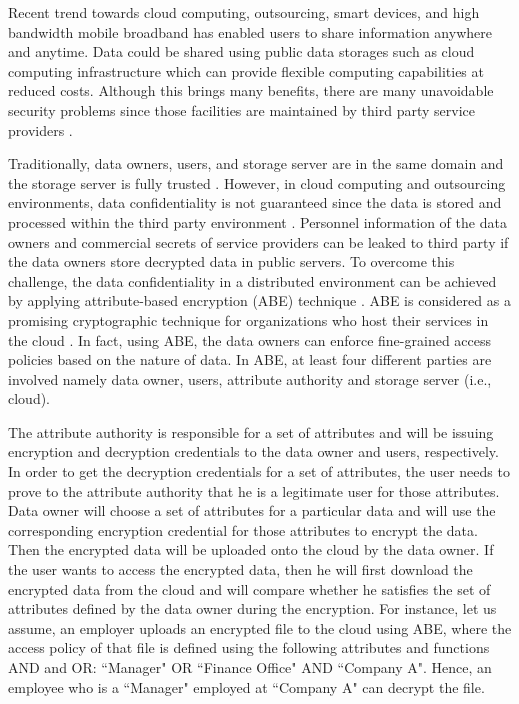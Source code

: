 \documentclass[10pt,journal]{IEEEtran}
\begin{document}
Recent trend towards cloud computing, outsourcing, smart devices, and high bandwidth mobile broadband has enabled users to share information anywhere and anytime. Data could be shared using public data storages such as cloud computing infrastructure which can provide flexible computing capabilities at reduced costs. Although this brings many benefits, there are many unavoidable security problems since those facilities are maintained by third party service providers \cite{SRuj}.

Traditionally,  data owners, users, and  storage server are in the same  domain and  the storage server is fully trusted \cite{RBAC, CWDRBAC, ERBAC, TRBAC, SRBAC, ESRBAC, LRBAC, LAAC, ESTAC}. However, in cloud computing and outsourcing  environments, data confidentiality is not guaranteed since the data is stored and processed within the third party environment \cite{Rahul5,Rahul6,Rahul7,Rahul8}. Personnel information of the data owners and  commercial secrets of service providers can be leaked to third party if the data owners  store decrypted data in public servers. To overcome this challenge, the data confidentiality in a distributed environment can be achieved by applying attribute-based encryption (ABE) technique \cite{FIBE, kpabe,cpabe}. ABE  is considered as a promising cryptographic technique for organizations who host their services in the cloud \cite{FIBE, kpabe,cpabe,Rahul1}. In fact, using ABE, the data owners can enforce fine-grained access policies based on the nature of data. In ABE, at least four different parties are involved namely data owner, users, attribute authority and storage server (i.e., cloud). 

The attribute authority is responsible for a set of attributes and will be issuing encryption and decryption credentials to the data owner and users, respectively. In order to get the decryption credentials for a set of attributes, the user needs to prove to the attribute authority that he is a legitimate user for those attributes. Data owner will choose a set of attributes for a particular data and will use the corresponding encryption credential for those attributes to encrypt the data. Then the encrypted data will be uploaded onto the cloud by the data owner. If the user wants to access the encrypted data, then he will first download the encrypted data from the cloud and will compare whether he satisfies the set of attributes defined by the data owner during the encryption. For instance, let us assume, an employer uploads an  encrypted file to the cloud using ABE, where the access policy of that file is defined using the following attributes and functions AND and OR: ``Manager" OR ``Finance Office" AND ``Company A". Hence, an employee who is a ``Manager"  employed at ``Company A" can  decrypt the file.
\end{document}
